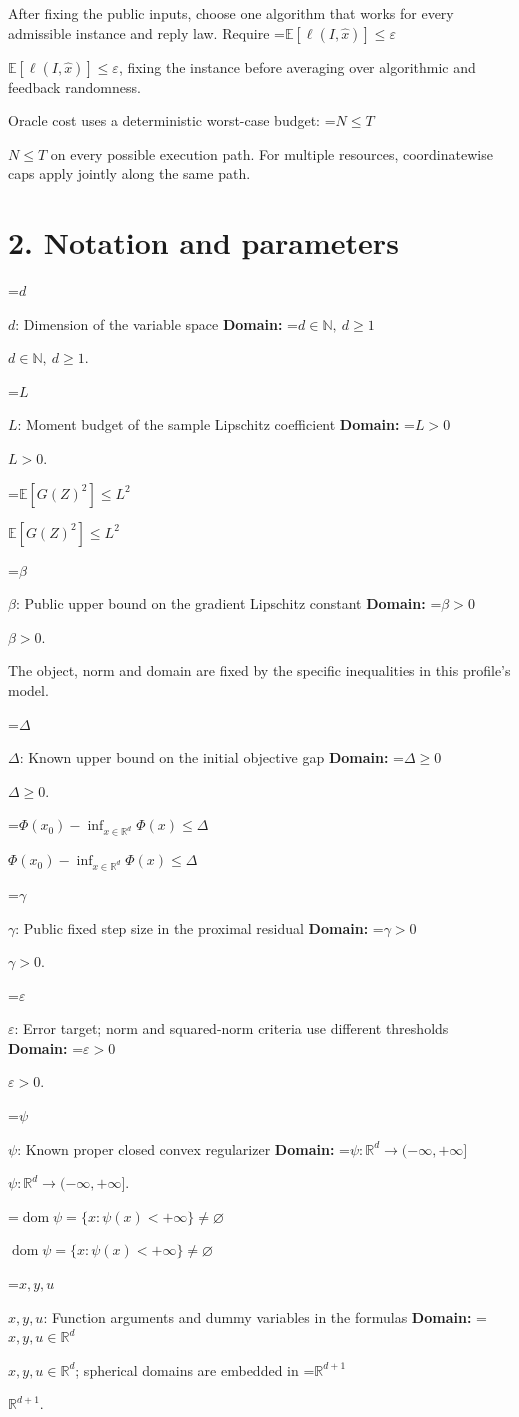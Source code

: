 \documentclass[10pt,a4paper]{article}
\newcommand{\AtlasMath}[1]{\par\begingroup\centering\setbox0=\hbox{$\displaystyle #1$}\ifdim\wd0>1.4\linewidth\typeout{ATLAS WIDE FORMULA: \the\wd0}\fi\ifdim\wd0>\linewidth\resizebox{\linewidth}{!}{\box0}\else\box0\fi\par\endgroup}
\newcommand{\AtlasInlineMath}[1]{\begingroup\setbox0=\hbox{$#1$}\ifdim\wd0>.4\linewidth\endgroup\AtlasMath{#1}\else\endgroup$#1$\fi}
\begin{document}
After fixing the public inputs, choose one algorithm that works for every admissible instance and reply law. Require \AtlasInlineMath{\mathbb{E}[\ell(I,\widehat{x})]\le \varepsilon}, fixing the instance before averaging over algorithmic and feedback randomness.

Oracle cost uses a deterministic worst-case budget: \AtlasInlineMath{N\le T} on every possible execution path. For multiple resources, coordinatewise caps apply jointly along the same path.

\section{2. Notation and parameters}
\AtlasInlineMath{d}: Dimension of the variable space \textbf{Domain:} \AtlasInlineMath{d\in\mathbb{N},\ d\ge1}.

\AtlasInlineMath{L}: Moment budget of the sample Lipschitz coefficient \textbf{Domain:} \AtlasInlineMath{L>0}.

\AtlasInlineMath{\mathbb{E}[G(Z)^2]\le L^2}

\AtlasInlineMath{\beta}: Public upper bound on the gradient Lipschitz constant \textbf{Domain:} \AtlasInlineMath{\beta>0}.

The object, norm and domain are fixed by the specific inequalities in this profile's model.

\AtlasInlineMath{\Delta}: Known upper bound on the initial objective gap \textbf{Domain:} \AtlasInlineMath{\Delta\ge0}.

\AtlasInlineMath{\Phi(x_0)-\inf_{x\in\mathbb{R}^d}\Phi(x)\le\Delta}

\AtlasInlineMath{\gamma}: Public fixed step size in the proximal residual \textbf{Domain:} \AtlasInlineMath{\gamma>0}.

\AtlasInlineMath{\varepsilon}: Error target; norm and squared-norm criteria use different thresholds \textbf{Domain:} \AtlasInlineMath{\varepsilon>0}.

\AtlasInlineMath{\psi}: Known proper closed convex regularizer \textbf{Domain:} \AtlasInlineMath{\psi:\mathbb{R}^d\to(-\infty,+\infty]}.

\AtlasInlineMath{\operatorname{dom}\psi=\{x:\psi(x)<+\infty\}\ne\varnothing}

\AtlasInlineMath{x,y,u}: Function arguments and dummy variables in the formulas \textbf{Domain:} \AtlasInlineMath{x,y,u\in\mathbb{R}^d}; spherical domains are embedded in \AtlasInlineMath{\mathbb{R}^{d+1}}.
\end{document}

